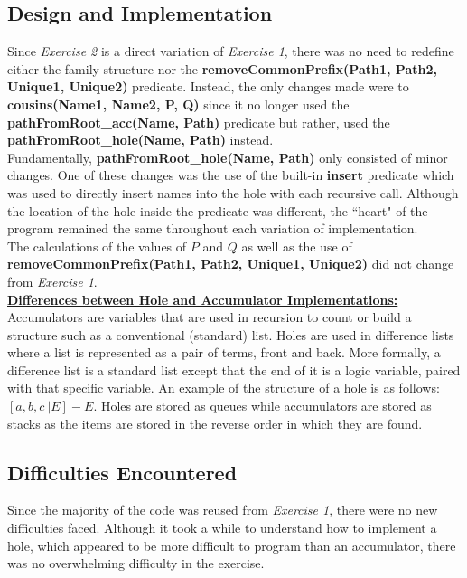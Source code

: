 \documentclass[11pt]{article}
\newcommand{\forceindent}{\leavevmode{\parindent=1em\indent}}
\begin{document}
	\subsection{Design and Implementation}
\forceindent Since \emph{Exercise 2} is a direct variation of \emph{Exercise 1}, there was no need to redefine either the family structure nor the \textbf{removeCommonPrefix(Path1, Path2, Unique1, Unique2)} predicate. Instead, the only changes made were to \textbf{cousins(Name1, Name2, P, Q)} since it no longer used the \textbf{pathFromRoot\_acc(Name, Path)} predicate but rather, used the \textbf{pathFromRoot\_hole(Name, Path)} instead. \\ 

Fundamentally, \textbf{pathFromRoot\_hole(Name, Path)} only consisted of minor changes. One of these changes was the use of the built-in \textbf{insert} predicate which was used to directly insert names into the hole with each recursive call. Although the location of the hole inside the predicate was different, the ``heart" of the program remained the same throughout each variation of implementation. \\

The calculations of the values of $P$ and $Q$ as well as the use of \textbf{removeCommonPrefix(Path1, Path2, Unique1, Unique2)} did not change from \emph{Exercise 1}. \\

\underline{\textbf{Differences between Hole and Accumulator Implementations:}} \\

Accumulators are variables that are used in recursion to count or build a structure such as a conventional (standard) list. Holes are used in difference lists where a list is represented as a pair of terms, front and back. More formally, a difference list is a standard list except that the end of it is a logic variable, paired with that specific variable. An example of the structure of a hole is as follows:  $[a,b,c \: | E]-E$.
Holes are stored as queues while accumulators are stored as stacks as the items are stored in the reverse order in which they are found.
	\subsection{Difficulties Encountered}
\forceindent Since the majority of the code was reused from \emph{Exercise 1}, there were no new difficulties faced. Although it took a while to understand how to implement a hole, which appeared to be more difficult to program than an accumulator, there was no overwhelming difficulty in the exercise.
\end{document}
